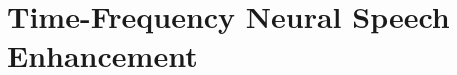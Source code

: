 \documentclass[journal]{IEEEtran}
\newcommand{\qian}[1]{{\color{magenta}#1}}
\begin{document}

\section{Time-Frequency Neural Speech Enhancement}\label{sec:4}

\end{document}

